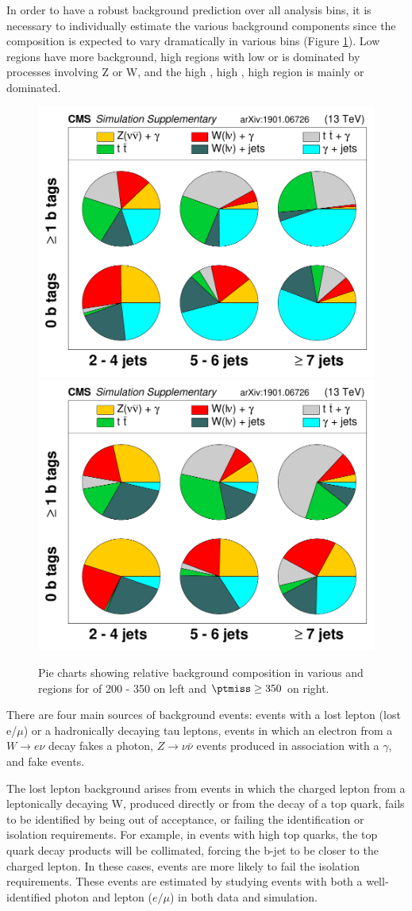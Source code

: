 In order to have a robust background prediction over all analysis bins, it is 
necessary to individually estimate the various background components since 
the composition is expected to vary dramatically in various bins (Figure \ref{fig:supp_Sim_Pie_lowMET}).
Low \ptmiss regions have more \gjets background, high \ptmiss regions with low \nj or \nb
is dominated by processes involving Z or W, and the high \ptmiss, high \nj, high \nb region is
mainly \ttjets or \ttg dominated.
\begin{figure}[h!]
\centering
\includegraphics[width=0.48\linewidth]{../Figures/Chap3/anaPublic/supp_Sim_Pie_lowMET}
\includegraphics[width=0.48\linewidth]{../Figures/Chap3/anaPublic/supp_Sim_Pie}
\captionsetup{width=.9\linewidth}
\caption[Pie charts showing BG in low \ptmiss]{Pie charts showing relative background composition in various \nj and \nb regions for \ptmiss of 200 - 350 \gev on left and $\ptmiss\geq 350$ \gev on right.}
\label{fig:supp_Sim_Pie_lowMET}
\end{figure}

There are four main sources of background events:  events with a lost lepton (lost e/$\mu$) or a hadronically 
decaying tau leptons, events in which an electron from a $W\rightarrow e \nu$ decay fakes a photon,
$Z\rightarrow \nu \bar{\nu}$ events produced in association with a $\gamma$, and fake \ptmiss events. 

The lost lepton background arises from events in which the charged lepton
from a leptonically decaying W, produced directly or from the decay of 
a top quark, fails to be identified by being out of acceptance, 
or failing the identification or isolation requirements.  For example, in events
with high \pt top quarks, the top quark decay products will be collimated, forcing the b-jet
to be closer to the charged lepton.  In these cases, events are more likely to 
fail the isolation requirements.  These events are estimated by studying events
with both a  well-identified photon and lepton ($e/\mu$) in both data and simulation.  

